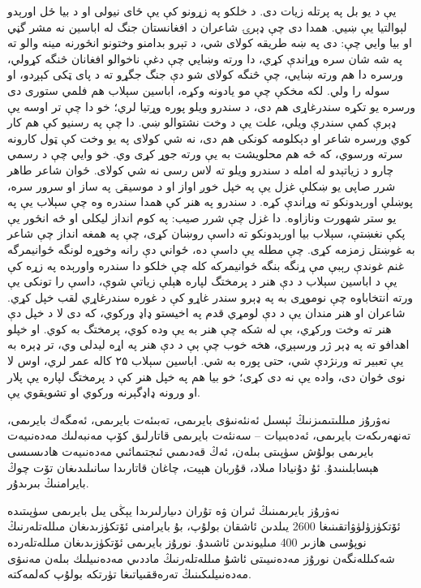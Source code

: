 \documentclass[a4paper]{article}
\begin{document}
یې د یو بل په پرتله زیات دی. د خلکو په زړونو کې یې ځای نیولی او د بیا ځل اورېدو لېوالتیا یې ښيي. همدا دی چې ډېرۍ شاعران د افغانستان جنگ له اباسین نه مشر گڼي او بیا وايي چې: دی په ښه طریقه کولای شي، د تېرو بدامنو وختونو انځورنه مینه والو ته په شه شان سره وړاندې کړي، دا ورته وښایي چې دغې ناخوالو افغانان څنگه کړولي، ورسره دا هم ورته ښايي، چې څنگه کولای شو دې جنگ جگړو ته د پای ټکی کېږدو، او سوله را ولي. لکه مخکې چې مو یادونه وکړه، اباسین سېلاب هم فلمي ستوری دی ورسره یو تکړه سندرغاړی هم دی، د سندرو ویلو پوره وړتیا لري؛ خو دا چې تر اوسه یې ډېرې کمې سندرې ویلي، علت یې د وخت نشتوالو ښي. دا چې په رسنیو کې هم کار کوي ورسره شاعر او دېکلومه کونکی هم دی، نه شي کولای په یو وخت کې ټول کارونه سرته ورسوي، که څه هم محلویشت به یې ورته جوړ کړی وي. خو وايي چې د رسمي چارو د زیاتېدو له امله د سندرو ویلو ته لاس رسی نه شي کولای. ځوان شاعر طاهر شرر صاپی یو ښکلې غزل یې په خپل خوږ اواز او د موسیقۍ په ساز او سرور سره، پوښلې اورېدونکو ته وړاندې کړه. د سندرو په هنر کې همدا سندره وه چې سېلاب یې په یو ستر شهورت ونازاوه. دا غزل چې شرر صیب: په کوم انداز لیکلی او څه انځور یې پکې نغښتې، سېلاب بیا اورېدونکو ته داسې روښان کړی، چې په همغه انداز چې شاعر به غوښتل زمزمه کړی. چې مطله یې داسې ده، ځواني دې رانه وخوړه لونگه ځوانیمرگه غنم غوندې رېبې مې ړنگه بنگه ځوانیمرکه کله چې خلکو دا سندره واورېده په زړه کې یې د اباسین سېلاب د دې هنر د پرمختگ لپاره هېلې زیاتې شوې، داسې را تونکی یې ورته انتخاباوه چې نوموړی به په ډېرو سندر غاړو کې د غوره سندرغاړي لقب خپل کړي. شاعران او هنر مندان یې د دې لومړي قدم په اخیستو ډاډ ورکوي، که دی لا د خپل دې هنر ته وخت ورکړي، بې له شکه چې هنر به یې وده کوي، پرمختگ به کوي. او خپلو اهدافو ته په ډېر ژر ورسېږي، هخه خوب چې ېې د دې هنر په اړه لیدلی وي، تر ډېره به یې تعبیر ته ورنژدې شي، حتی پوره به شي. اباسین سېلاب ۲۵ کاله عمر لري، اوس لا نوی ځوان دی، واده یې نه دی کړی؛ خو بیا هم په خپل هنر کې د پرمختگ لپاره یې پلار او ورونه ډاډگېرنه ورکوي او تشویقوي یې.

نەۋرۇز مىللىتىمىزنىڭ ئېسىل ئەنئەنىۋى بايرىمى، تەبىئەت بايرىمى، ئەمگەك بايرىمى، تەنھەرىكەت بايرىمى، ئەدەبىيات – سەنئەت بايرىمى قاتارلىق كۆپ مەنبەلىك مەدەنىيەت بايرىمى بولۇش سۈپىتى بىلەن، ئەڭ قەدىمىي ئىجتىمائىي مەدەنىيەت ھادىسىسى ھېسابلىنىدۇ. ئۇ دۇنيادا مىلاد، قۇربان ھېيت، چاغان قاتارىدا سانىلىدىغان تۆت چوڭ بايرامنىڭ بىرىدۇر.



نەۋرۇز بايرىمىنىڭ ئىران ۋە تۇران دىيارلىرىدا يېڭى يىل بايرىمى سۈپىتىدە ئۆتكۈزۈلۈۋاتقىنىغا 2600 يىلدىن ئاشقان بولۇپ، بۇ بايرامنى ئۆتكۈزىدىغان مىللەتلەرنىڭ نوپۇسى ھازىر 400 مىليوندىن ئاشىدۇ. نورۇز بايرىمى ئۆتكۈزىدىغان مىللەتلەردە شەكىللەنگەن نورۇز مەدەنىيىتى ئاشۇ مىللەتلەرنىڭ ماددىي مەدەنىيلىك بىلەن مەنىۋى مەدەنىيلىكىنىڭ تەرەققىياتىغا تۈرتكە بولۇپ كەلمەكتە.
\end{document}
